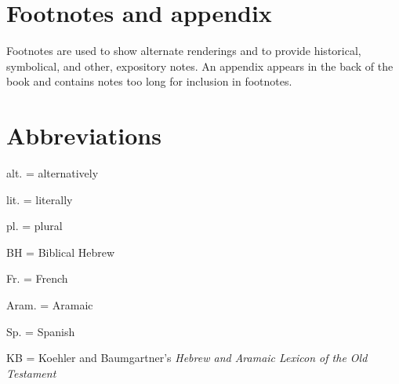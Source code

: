 \section*{Footnotes and appendix}
Footnotes are used to show alternate renderings and to provide historical, symbolical, and other, expository notes. An appendix appears in the back of the book and contains notes too long for inclusion in footnotes.

\section*{Abbreviations}
alt. = alternatively

lit. = literally %

pl. = plural

BH = Biblical Hebrew

Fr. = French

Aram. = Aramaic

Sp. = Spanish

KB = Koehler and Baumgartner's \textit{Hebrew and Aramaic Lexicon of the Old Testament}
\twocolumn
